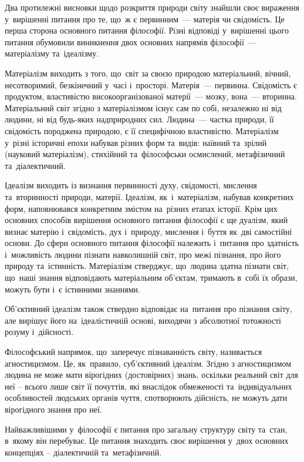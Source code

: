 \documentclass[a5paper,oneside,DIV=12,12pt,headings=small]{scrartcl}
\begin{document}
		Два протилежні висновки щодо розкриття природи світу знайшли своє вираження у~вирішенні питання про те, що~ж є первинним~— матерія чи свідомість. Це перша сторона основного питання філософії. Різні відповіді у~вирішенні цього питання обумовили виникнення двох основних напрямів філософії~— матеріалізму та~ідеалізму.
		
		Матеріалізм виходить з того, що~світ за своєю природою матеріальний, вічний, несотворимий, безкінечний у~часі і~просторі. Матерія~— первинна. Свідомість є продуктом, властивістю високоорганізованої матерії~— мозку, вона~— вторинна. Матеріальний світ згідно з матеріалізмом існує сам по собі, незалежно ні від людини, ні від будь-яких надприродних сил. Людина~— частка природи, її свідомість породжена природою, є її специфічною властивістю. Матеріалізм у~різні історичні епохи набував різних форм та~видів: наївний та~зрілий (науковий матеріалізм), стихійний та~філософськи осмислений, метафізичний та~діалектичний.
		
		Ідеалізм виходить із визнання первинності духу, свідомості, мислення та~вторинності природи, матерії. Ідеалізм, як~і~матеріалізм, набував конкретних форм, наповнювався конкретним змістом на~різних етапах історії.
		Крім цих основних способів вирішення основного питання філософії є ще дуалізм, який визнає матерію і~свідомість, дух і~природу, мислення і~буття як~дві самостійні основи.
		До сфери основного питання філософії належить і~питання про здатність і~можливість людини пізнати навколишній світ, про межі пізнання, про його природу та~істинність. Матеріалізм стверджує, що~людина здатна пізнати світ, що~наші знання відповідають матеріальним об'єктам, тримають в~собі їх образи, можуть бути і~є істинними знаннями.
		
		Об'єктивний ідеалізм також ствердно відповідає на~питання про пізнання світу, але вирішує його на~ідеалістичній основі, виходячи з абсолютної тотожності розуму і~дійсності.
		
		Філософський напрямок, що~заперечує пізнаванність світу, називається агностицизмом. Це, як~правило, суб'\-єк\-тив\-ний ідеалізм. Згідно з агностицизмом людина не може мати вірогідних (достовірних) знань, оскільки реальний світ для неї – всього лише світ її почуттів, які внаслідок обмеженості та~індивідуальних особливостей людських органів чуття, спотворюють дійсність, не можуть дати вірогідного знання про неї.
		
		Найважливішими у~філософії є питання про загальну структуру світу та~стан, в~якому він перебуває. Це питання знаходить своє вирішення у~двох основних концепціях – діалектичній та~метафізичній.
	
\end{document}
